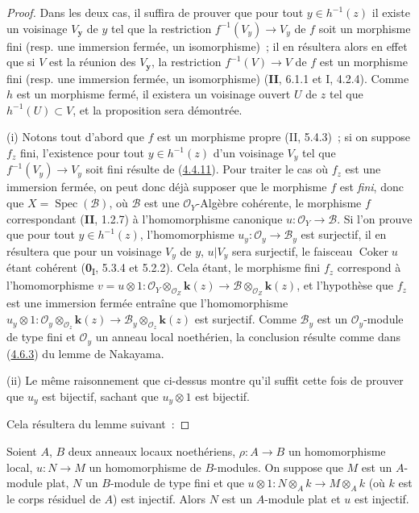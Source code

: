 \begin{proof}
Dans les deux cas, il suffira de prouver que pour tout $y\in h^{-1}(z)$ il
existe un voisinage $V_{\boldsymbol{y}}$ de $y$ tel que la restriction
$f^{-1}(V_y)\to V_y$ de $f$ soit un morphisme fini (resp. une immersion
fermée, un isomorphisme)~; il en résultera alors en effet que si $V$ est la
réunion des $V_{\boldsymbol{y}}$, la restriction $f^{-1}(V)\to V$ de $f$ est un morphisme
fini (resp. une immersion fermée, un isomorphisme) (\textbf{II}, 6.1.1 et I, 4.2.4).
Comme $h$ est un morphisme fermé, il existera un voisinage ouvert $U$ de $z$
tel que $h^{-1}(U)\subset V$, et la proposition sera démontrée.

\noindent (i) Notons tout d'abord que $f$ est un morphisme propre
(II, 5.4.3)~; si on
suppose $f_z$ fini, l'existence pour tout
$y\in h^{-1}(z)$ d'un voisinage $V_y$ tel que $f^{-1}(V_y)\to V_y$ soit fini
résulte de (\hyperref[III.4.4.11-fr]{4.4.11}).
Pour traiter le cas où $f_z$ est une immersion fermée, on peut donc déjà
supposer que le morphisme $f$ est \emph{fini}, donc que
$X=\operatorname{Spec}(\mathcal B)$, où $\mathcal B$ est une
$\mathcal O_Y$-Algèbre cohérente, le morphisme $f$ correspondant (\textbf{II}, 1.2.7)
à l'homomorphisme canonique $u:\mathcal O_Y\to\mathcal B$. Si l'on prouve
que pour tout $y\in h^{-1}(z)$, l'homomorphisme
$u_y:\mathcal O_y\to\mathcal B_y$ est surjectif, il en résultera que pour un
voisinage $V_y$ de $y$, $u|V_y$ sera surjectif, le faisceau
$\operatorname{Coker}u$ étant cohérent (\textbf{0}\textsubscript{I}, 5.3.4 et 5.2.2).
Cela étant, le morphisme fini $f_z$ correspond à l'homomorphisme
$v=u\otimes1:
\mathcal O_Y\otimes_{\mathcal O_Z}\boldsymbol{k}(z)
\longrightarrow
\mathcal B\otimes_{\mathcal O_Z}\boldsymbol{k}(z)$,
et l'hypothèse que $f_z$ est une immersion fermée entraîne que
l'homomorphisme
$u_y\otimes1:
\mathcal O_y\otimes_{\mathcal O_z}\boldsymbol{k}(z)
\longrightarrow
\mathcal B_y\otimes_{\mathcal O_z}\boldsymbol{k}(z)$
est surjectif. Comme $\mathcal B_y$ est un $\mathcal O_y$-module de type
fini et $\mathcal O_y$ un anneau local noethérien, la conclusion résulte
comme dans (\hyperref[III.4.6.3-fr]{4.6.3}) du lemme de Nakayama.

\noindent (ii) Le même raisonnement que ci-dessus montre qu'il
suffit cette fois de prouver que $u_y$ est bijectif, sachant que
$u_y\otimes1$ est bijectif.

Cela résultera du lemme suivant~:
\end{proof}

\begin{lemma}[4.6.7.1]
\label{III.4.6.7.1-fr}
Soient $A$, $B$ deux anneaux locaux noethériens,
$\rho:A\to B$ un homomorphisme local, $u:N\to M$ un homomorphisme de
$B$-modules. On suppose que $M$ est un $A$-module plat, $N$ un $B$-module
de type fini et que
$u\otimes1:N\otimes_Ak\longrightarrow M\otimes_Ak$
(où $k$ est le corps résiduel de $A$) est injectif. Alors $N$ est un
$A$-module plat et $u$ est injectif.
\end{lemma}

